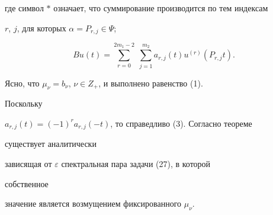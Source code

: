 где символ $*$ означает, что суммирование производится по тем индексам 


$r$, $j$, для которых $\alpha=P_{r,j}\in\Psi$; 


$$ 


B u(t)=\sum^{2m_1-2}_{r=0}\;\sum^{m_2}_{j=1} 


a_{r,j}(t)u^{(r)}(P_{r,j}t). 


$$ 


Ясно, что $\mu_\nu=b_\nu$, $\nu\in Z_+$, и выполнено равенство (1). 


Поскольку 


$a_{r,j}(t)=(-1)^r a_{r,j}(-t)$, то справедливо (3). Согласно теореме 


существует аналитически 


зависящая от $\varepsilon$ спектральная пара задачи (27), в которой 


собственное 


значение является возмущением фиксированного $\mu_\nu$. 


 


